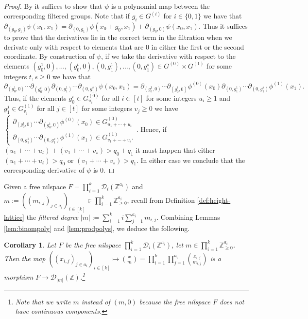 \documentclass[a4paper,12pt,reqno]{amsart}
\newtheorem{corollary}[theorem]{Corollary}
\theoremstyle{definition}
\def\to{\rightarrow}
\newcommand{\mc}{\mathcal}
\newcommand{\mb}{\mathbb}
\begin{document}
\begin{proof}
By \cite[Theorem 2.2.14]{Cand:Notes1} it suffices to show that $\psi$ is a polynomial map between the corresponding filtered groups. Note that if $g_i\in G^{(i)}$ for $i\in\{0,1\}$ we have that $\partial_{(g_0,g_1)}\psi(x_0,x_1)=\partial_{(0,g_1)}\psi(x_0+g_0,x_1)+\partial_{(g_0,0)}\psi(x_0,x_1)$. Thus it suffices to prove that the derivatives lie in the correct term in the filtration when we derivate only with respect to elements that are 0 in either the first or the second coordinate. By construction of $\psi$, if we take the derivative with respect to the elements $(g_0^1,0),\ldots,(g_0^t,0),(0,g_1^1),\ldots,(0,g_1^s)\in G^{(0)}\times G^{(1)}$ for some integers $t,s\ge 0$ we have that
\[
\partial_{(g_0^1,0)}\cdots \partial_{(g_0^t,0)}\partial_{(0,g_1^1)}\cdots \partial_{(0,g_1^s)}\psi(x_0,x_1)= \partial_{(g_0^1,0)}\cdots \partial_{(g_0^t,0)}\phi^{(0)}(x_0) \partial_{(0,g_1^1)}\cdots \partial_{(0,g_1^s)}\phi^{(1)}(x_1).
\]
Thus, if the elements $g_0^i\in G^{(0)}_{u_i}$ for all $i\in [t]$ for some integers $u_i\ge 1$ and $g_1^j\in G^{(1)}_{v_j}$ for all $j\in [t]$ for some integers $v_j\ge 0$ we have $
\begin{cases}
 \partial_{(g_0^1,0)}\cdots \partial_{(g_0^t,0)}\phi^{(0)}(x_0)\in G^{(0)}_{u_1+\cdots+u_t} \\
 \partial_{(0,g_1^1)}\cdots \partial_{(0,g_1^s)}\phi^{(1)}(x_1) \in G^{(1)}_{v_1+\cdots+v_s}.
\end{cases}$. Hence, if $(u_1+\cdots+u_t)+(v_1+\cdots+v_s)>q_0+q_1$ it must happen that either $(u_1+\cdots+u_t)>q_0$ or $(v_1+\cdots+v_s)>q_1$. In either case we conclude that the corresponding derivative of $\psi$ is $0$.
\end{proof}
\noindent Given a free nilspace $F=\prod_{i=1}^k \mc{D}_i(\mb{Z}^{a_i})$ and $m:=((m_{i,j})_{j\in a_i})_{i\in[k]} \in \prod_{i=1}^k \mb{Z}_{\ge 0}^{a_i}$, recall from Definition \ref{def:height-lattice} the \emph{filtered degree} $|m|:=\sum_{i=1}^k i\sum_{j=1}^{a_i}m_{i,j}$. Combining Lemmas \ref{lem:binompoly} and \ref{lem:prodpolys}, we deduce the following. 
\begin{corollary}\label{cor:binom-is-poly}
Let $F$ be the free nilspace $\prod_{i=1}^k \mc{D}_i(\mb{Z}^{a_i})$, let $m \in \prod_{i=1}^k \mb{Z}_{\ge 0}^{a_i}$. Then the map $((x_{i,j})_{j\in a_i})_{i\in [k]} \mapsto \binom{x}{m}=\prod_{i=1}^k\prod_{j=1}^{a_i} \binom{x_{i,j}}{m_{i,j}}$ is a morphism $F\to \mc{D}_{|m|}(\mb{Z})$.\footnote{Note that we write $m$ instead of $(m,0)$ because the free nilspace $F$ does not have continuous components.}
\end{corollary} 
\end{document}
